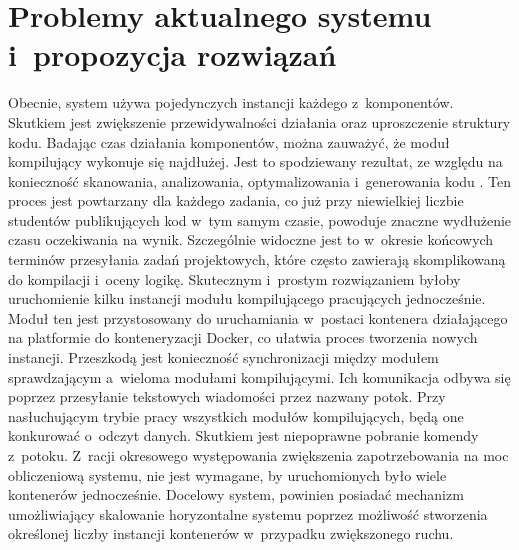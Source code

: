 \section{Problemy aktualnego systemu i~propozycja rozwiązań}
\indent Obecnie, system używa pojedynczych instancji każdego z~komponentów. Skutkiem jest zwiększenie przewidywalności działania oraz uproszczenie struktury kodu. Badając czas działania komponentów, można zauważyć, że moduł kompilujący wykonuje się najdłużej. Jest to spodziewany rezultat, ze względu na konieczność skanowania, analizowania, optymalizowania i~generowania kodu \cite{procesKompilacji}. Ten proces jest powtarzany dla każdego zadania, co już przy niewielkiej liczbie studentów publikujących kod w~tym samym czasie, powoduje znaczne wydłużenie czasu oczekiwania na wynik. Szczególnie widoczne jest to w~okresie końcowych terminów przesyłania zadań projektowych, które często zawierają skomplikowaną do kompilacji i~oceny logikę. Skutecznym i~prostym rozwiązaniem byłoby uruchomienie kilku instancji modułu kompilującego pracujących jednocześnie. Moduł ten jest przystosowany do uruchamiania w~postaci kontenera działającego na platformie do konteneryzacji Docker, co ułatwia proces tworzenia nowych instancji. Przeszkodą jest konieczność synchronizacji między modułem sprawdzającym a~wieloma modułami kompilującymi. Ich komunikacja odbywa się poprzez przesyłanie tekstowych wiadomości przez nazwany potok. Przy nasłuchującym trybie pracy wszystkich modułów kompilujących, będą one konkurować o~odczyt danych. Skutkiem jest niepoprawne pobranie komendy z~potoku. Z~racji okresowego występowania zwiększenia zapotrzebowania na moc obliczeniową systemu, nie jest wymagane, by uruchomionych było wiele kontenerów jednocześnie. Docelowy system, powinien posiadać mechanizm umożliwiający skalowanie horyzontalne systemu poprzez możliwość stworzenia określonej liczby instancji kontenerów w~przypadku zwiększonego ruchu.
